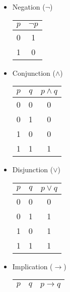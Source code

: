 \documentclass{report}
\begin{document}
    \begin{itemize}
        \item Negation ($\neg$)
        \begin{table}[h!]
            \centering
            \begin{tabular}{|c|c|}
            \hline
            $p$ & $\neg p$ \\ \hline
            0   & 1        \\ \hline
            1   & 0        \\ \hline
            \end{tabular}
        \end{table}
        \item Conjunction ($\wedge $)
        \begin{table}[h!]
            \centering
            \begin{tabular}{|c|c|c|}
            \hline
            $p$ & $q$ & $p \wedge q$ \\ \hline
            0   & 0   &  0   \\ \hline
            0   & 1   &  0   \\ \hline
            1   & 0   &  0   \\ \hline
            1   & 1   &  1   \\ \hline
            \end{tabular}
        \end{table}
        \item Disjunction ($\vee $)
        \begin{table}[h!]
            \centering
            \begin{tabular}{|c|c|c|}
            \hline
            $p$ & $q$ & $p \vee q$ \\ \hline
            0   & 0   &  0   \\ \hline
            0   & 1   &  1   \\ \hline
            1   & 0   &  1   \\ \hline
            1   & 1   &  1   \\ \hline
            \end{tabular}
        \end{table}
        \item Implication ($\rightarrow$)
        \begin{table}[h!]
            \centering
            \begin{tabular}{|c|c|c|}
            \hline
            $p$ & $q$ & $p \rightarrow q$ \\ \hline

\end{tabular}
\end{table}
\end{itemize}
\end{document}
